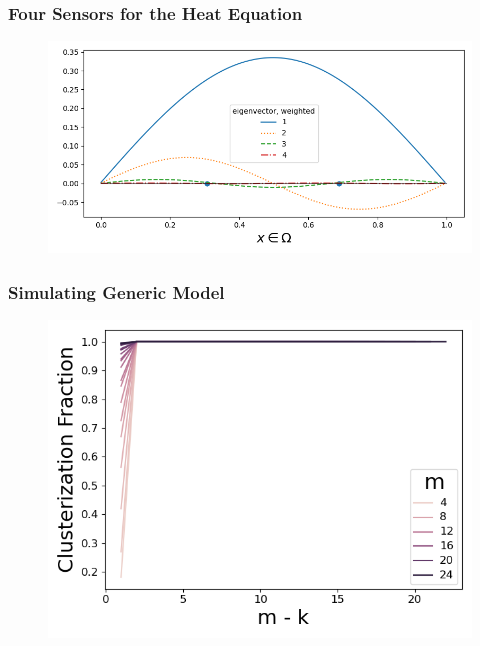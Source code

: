 \documentclass{beamer}
\begin{document}
\begin{frame}
  \frametitle{Four Sensors for the Heat Equation}
  \begin{figure}
    \centering
    \includegraphics[width=\textwidth]{figs/eigenvectors.png}
  \end{figure}
\end{frame}

\begin{frame}
  \frametitle{Simulating Generic Model}
  \begin{figure}
    \centering
    \includegraphics[width=\textwidth]{figs/simulations.png}
  \end{figure}
\end{frame}
\end{document}
